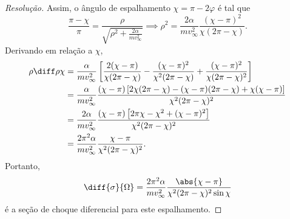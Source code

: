 \begin{proof}[Resolução]
    Assim, o ângulo de espalhamento \(\chi = \pi - 2 \varphi\) é tal que
    \begin{equation*}
        \frac{\pi - \chi}{\pi} = \frac{\rho}{\sqrt{\rho^2 + \frac{2 \alpha}{mv_\infty^2}}} \implies \rho^2 = \frac{2 \alpha}{m v_\infty^2} \frac{(\chi - \pi)^2}{\chi (2\pi - \chi)}.
    \end{equation*}
    Derivando em relação a \(\chi\),
    \begin{align*}
        \rho \diff\rho\chi &= \frac{\alpha}{mv_\infty^2} \left[\frac{2(\chi - \pi)}{\chi(2\pi - \chi)} - \frac{(\chi - \pi)^2}{\chi^2(2\pi - \chi)} + \frac{(\chi - \pi)^2}{\chi(2\pi - \chi)^2}\right]\\
                             &= \frac{\alpha}{m v_\infty^2 } \frac{(\chi - \pi)\left[2\chi(2\pi-\chi) - (\chi - \pi)(2\pi - \chi) + \chi(\chi - \pi)\right]}{\chi^2(2\pi - \chi)^2}\\
                             &= \frac{2\alpha}{m v_\infty^2 } \frac{(\chi - \pi)\left[2\pi\chi-\chi^2 + (\chi - \pi)^2\right]}{\chi^2(2\pi - \chi)^2}\\
                             &= \frac{2\pi^2 \alpha}{mv_\infty^2}\frac{\chi - \pi}{\chi^2(2\pi - \chi)^2}.
    \end{align*}
    Portanto,
    \begin{equation*}
        \diff{\sigma}{\Omega} = \frac{2\pi^2 \alpha}{mv_\infty^2} \frac{\abs{\chi - \pi}}{\chi^2 ( 2\pi - \chi)^2\sin \chi}
    \end{equation*}
    é a seção de choque diferencial para este espalhamento.
\end{proof}
